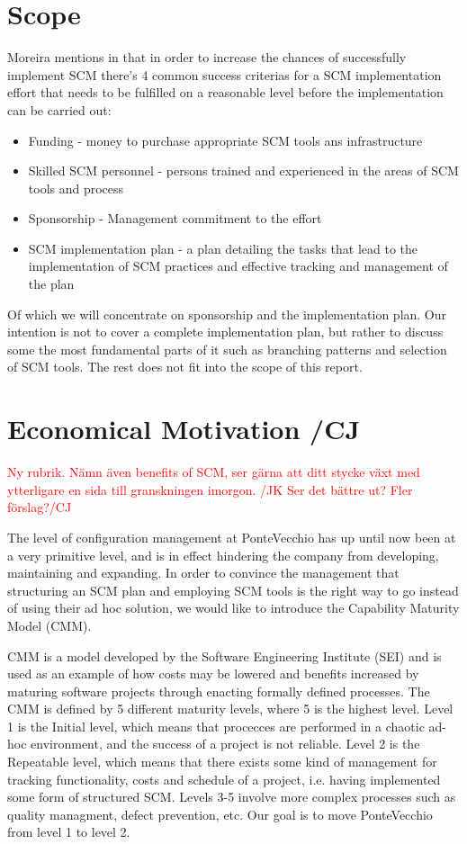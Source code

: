 \documentclass[10pt]{article}
\newcommand\remove[1]{\textcolor{red}{#1}}
\begin{document}
\section{Scope}
Moreira mentions in \cite{Moreira} that in order to increase the chances of successfully implement SCM there's 4 common success criterias for a SCM implementation effort that needs to be fulfilled on a reasonable level before the implementation can be carried out:
\begin{itemize}
\item Funding - money to purchase appropriate SCM tools ans infrastructure
\item Skilled SCM personnel - persons trained and experienced in the areas of SCM tools and process
\item Sponsorship - Management commitment to the effort
\item SCM implementation plan - a plan detailing the tasks that lead to the implementation of SCM practices and effective tracking and management of the plan
\end{itemize}
Of which we will concentrate on sponsorship and the implementation plan. Our intention is not to cover a complete implementation plan, but rather to discuss some the most fundamental parts of it such as branching patterns and selection of SCM tools. The rest does not fit into the scope of this report.
 
\section{Economical Motivation /CJ}
\remove{Ny rubrik. Nämn även benefits of SCM, ser gärna att ditt stycke växt med ytterligare en sida till granskningen imorgon. /JK}
\remove{Ser det bättre ut? Fler förslag?/CJ}

The level of configuration management at PonteVecchio has up until now been at a very primitive level, and is in effect hindering the company from developing, maintaining and expanding. In order to convince the management that structuring an SCM plan and employing SCM tools is the right way to go instead of using their ad hoc solution, we would like to introduce the Capability Maturity Model (CMM). 

\noindent CMM is a model developed by the Software Engineering Institute (SEI) and is used as an example of how costs may be lowered and benefits increased by maturing software projects through enacting formally defined processes. The CMM is defined by 5 different maturity levels, where 5 is the highest level. Level 1 is the Initial level, which means that procecces are performed in a chaotic ad-hoc environment, and the success of a project is not reliable. Level 2 is the Repeatable level, which means that there exists some kind of management for tracking functionality, costs and schedule of a project\cite{Merant}, i.e. having implemented some form of structured SCM. Levels 3-5 involve more complex processes such as quality managment, defect prevention, etc. Our goal is to move PonteVecchio from level 1 to level 2. 
\end{document}
